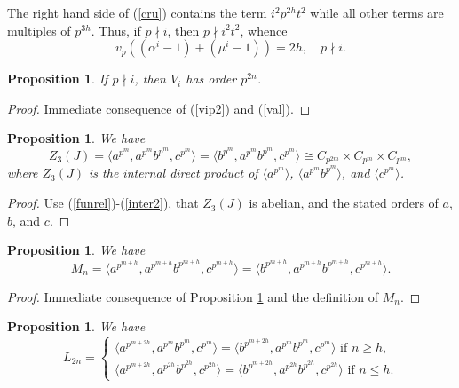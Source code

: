 \documentclass{amsart}
\newtheorem{prop}[theorem]{Proposition}
\theoremstyle{definition}
\theoremstyle{remark}
\begin{document}
The right hand side of (\ref{cru}) contains the term $i^2 p^{2h} t^2$ while
all other terms are multiples of $p^{3h}$. Thus, if $p\nmid i$, then $p\nmid i^2 t^2$, whence
\begin{equation}
\label{val}
v_p((\alpha^i-1)+(\mu^i-1))=2h,\quad p\nmid i. 
\end{equation}

\begin{prop}\label{v2n} If $p\nmid i$, then $V_i$ has order $p^{2n}$.
\end{prop}

\begin{proof} Immediate consequence of (\ref{vip2}) and (\ref{val}).
\end{proof}

\begin{prop}\label{nuevoandrea} We have
$$
Z_3(J)=\langle a^{p^{m}}, a^{p^{m}}b^{p^{m}},c^{p^{m}}\rangle=\langle b^{p^{m}},a^{p^{m}}b^{p^{m}},c^{p^{m}}\rangle
\cong C_{p^{2m}}\times  C_{p^{m}}\times C_{p^{m}},
$$
where $Z_3(J)$ is the internal direct product of $\langle a^{p^{m}}\rangle$, $\langle a^{p^{m}}b^{p^{m}}\rangle$,
and $\langle c^{p^{m}}\rangle$.
\end{prop}

\begin{proof} Use (\ref{funrel})-(\ref{inter2}), that $Z_3(J)$ is abelian, and the stated orders of $a$, $b$, and $c$.
\end{proof}

\begin{prop}\label{nuevoandrea2} We have
$$
M_n=\langle a^{p^{m+h}}, a^{p^{m+h}}b^{p^{m+h}},c^{p^{m+h}}\rangle=\langle b^{p^{m+h}}, a^{p^{m+h}}b^{p^{m+h}},c^{p^{m+h}}\rangle.
$$
\end{prop}

\begin{proof} Immediate consequence of Proposition \ref{nuevoandrea} and the definition of $M_n$.
\end{proof}

\begin{prop}\label{nuevoandrea3} We have
$$
L_{2n}=\begin{cases} \langle a^{p^{m+2h}}, a^{p^{m}}b^{p^{m}},c^{p^{m}}\rangle=\langle b^{p^{m+2h}}, a^{p^{m}}b^{p^{m}},c^{p^{m}}
\rangle\text{ if }n\geq h,\\
\langle a^{p^{m+2h}}, a^{p^{2h}}b^{p^{2h}},c^{p^{2h}}\rangle=\langle b^{p^{m+2h}}, a^{p^{2h}}b^{p^{2h}},c^{p^{2h}}
\rangle\text{ if }n\leq h.
\end{cases}
$$
\end{prop}
\end{document}
